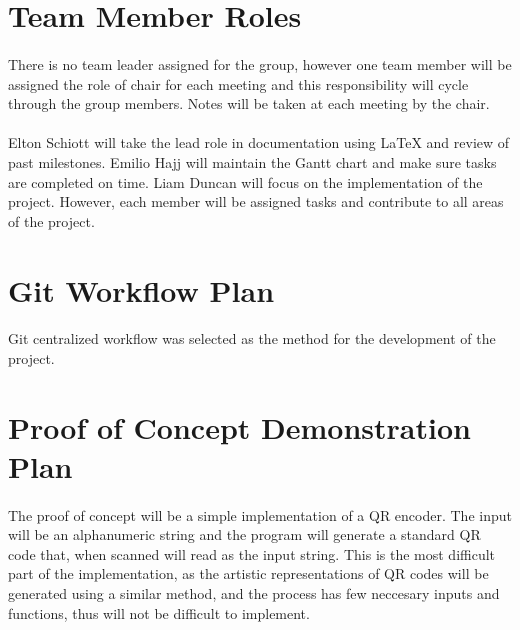 \documentclass{article}
\begin{document}
\section{Team Member Roles}

	\paragraph{}
	
		There is no team leader assigned for the group, however one team member 
		will be assigned the role of chair for each meeting and this 
		responsibility will cycle through the group members. Notes will be 
		taken at each meeting by the chair.
		
	\paragraph{}
		
		Elton Schiott will take the lead role in documentation using LaTeX and 
		review of past milestones. Emilio Hajj will maintain the Gantt chart 
		and make sure tasks are completed on time. Liam Duncan will focus on 
		the implementation of the project. However, each member will be 
		assigned tasks and contribute to all areas of the project.
		
\section{Git Workflow Plan}

	\paragraph{}
		
		Git centralized workflow was selected as the method for the development 
		of the project.
		
\section{Proof of Concept Demonstration Plan}

	\paragraph{}
		
		The proof of concept will be a simple implementation of a QR encoder. 
		The input will be an alphanumeric string and the program will generate 
		a standard QR code that, when scanned will read as the input string. 
		This is the most difficult part of the implementation, as the artistic 
		representations of QR codes will be generated using a similar method, 
		and the process has few neccesary inputs and functions, thus will not be difficult to 
		implement. 
		
\end{document}
